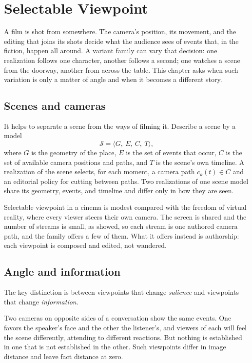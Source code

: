 \chapter{Selectable Viewpoint}\label{ch:viewpoint}

A film is shot from somewhere. The camera's position, its movement, and the editing that joins its shots decide what the audience sees of events that, in the fiction, happen all around. A variant family can vary that decision: one realization follows one character, another follows a second; one watches a scene from the doorway, another from across the table. This chapter asks when such variation is only a matter of angle and when it becomes a different story.

\section{Scenes and cameras}

It helps to separate a scene from the ways of filming it. Describe a scene by a model
\begin{equation}
\mathcal S=\langle G,\ E,\ C,\ T\rangle,
\end{equation}
where $G$ is the geometry of the place, $E$ is the set of events that occur, $C$ is the set of available camera positions and paths, and $T$ is the scene's own timeline. A realization of the scene selects, for each moment, a camera path $c_k(t)\in C$ and an editorial policy for cutting between paths. Two realizations of one scene model share its geometry, events, and timeline and differ only in how they are seen.

Selectable viewpoint in a cinema is modest compared with the freedom of virtual reality, where every viewer steers their own camera. The screen is shared and the number of streams is small, as  showed, so each stream is one authored camera path, and the family offers a few of them. What it offers instead is authorship: each viewpoint is composed and edited, not wandered.

\section{Angle and information}

The key distinction is between viewpoints that change \emph{salience} and viewpoints that change \emph{information}.

Two cameras on opposite sides of a conversation show the same events. One favors the speaker's face and the other the listener's, and viewers of each will feel the scene differently, attending to different reactions. But nothing is established in one that is not established in the other. Such viewpoints differ in image distance and leave fact distance at zero.

